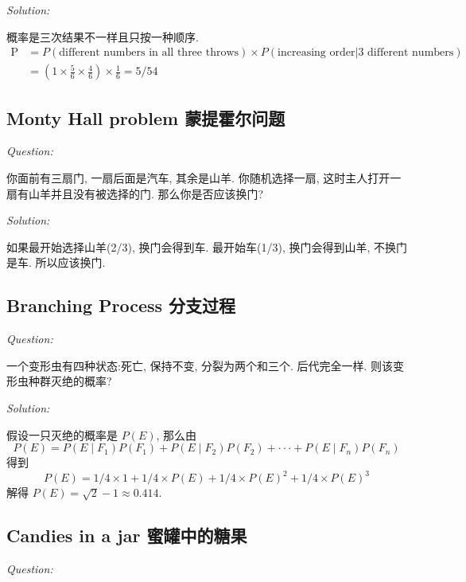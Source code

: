 \documentclass[12pt]{book}
\begin{document}
   \noindent \textit{Solution:} 
   
   概率是三次结果不一样且只按一种顺序. $$\begin{aligned}\mathrm{P}&=P(\text{different numbers in all three throws})\times P(\text{increasing order|3 different numbers})\\&=(1\times\frac{5}{6}\times\frac{4}{6})\times\frac{1}{6}=5/54\end{aligned}$$
 
 \subsection{Monty Hall problem 蒙提霍尔问题}
\noindent \textit{Question:} 
 
 你面前有三扇门, 一扇后面是汽车, 其余是山羊. 你随机选择一扇, 这时主人打开一扇有山羊并且没有被选择的门. 那么你是否应该换门?
 
\noindent \textit{Solution:} 
    
如果最开始选择山羊(2/3), 换门会得到车. 最开始车(1/3), 换门会得到山羊, 不换门是车. 所以应该换门.    
 
 \subsection{Branching Process 分支过程}
\noindent \textit{Question:}  
 
 一个变形虫有四种状态:死亡, 保持不变, 分裂为两个和三个. 后代完全一样. 则该变形虫种群灭绝的概率?
  
\noindent \textit{Solution:} 

假设一只灭绝的概率是 $P(E)$, 那么由$$P(E)=P(E\mid F_1)P(F_1)+P(E\mid F_2)P(F_2)+\cdotp\cdotp\cdotp+P(E\mid F_n)P(F_n)$$ 得到 $$P(E)=1/4\times1+1/4\times P(E)+1/4\times P(E)^2+1/4\times P(E)^3$$ 解得 $P(E)=\sqrt{2}-1\approx0.414$.
 
  \subsection{Candies in a jar 蜜罐中的糖果}
\noindent \textit{Question:}  


 
 
 
 
 
 
 
 
 
 
 
 
 
 
 
 
 
 
\end{document}
